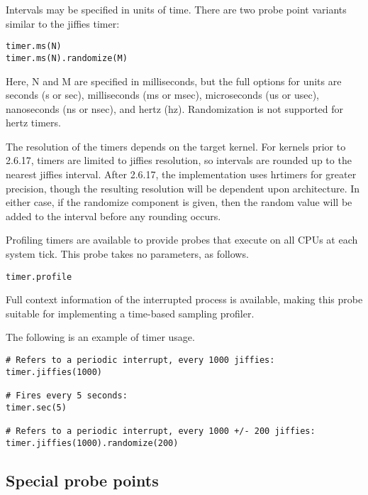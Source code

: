 \documentclass[twoside,english]{article}
\newenvironment{vindent}
{\begin{list}{}{\setlength{\listparindent}{6pt}}
\item[]}
{\end{list}}
\begin{document}
Intervals may be specified in units of time. There are two probe point variants
similar to the jiffies timer:

\begin{vindent}
\begin{verbatim}
timer.ms(N)
timer.ms(N).randomize(M)
\end{verbatim}
\end{vindent}
Here, N and M are specified in milliseconds, but the
full options for units are seconds (s or sec), milliseconds (ms or msec),
microseconds (us or usec), nanoseconds (ns or nsec), and hertz (hz). Randomization
is not supported for hertz timers.

The resolution of the timers depends on the target kernel. For kernels prior
to 2.6.17, timers are limited to jiffies resolution, so intervals are rounded
up to the nearest jiffies interval. After 2.6.17, the implementation uses
hrtimers for greater precision, though the resulting resolution will be dependent
upon architecture. In either case, if the randomize component is given, then
the random value will be added to the interval before any rounding occurs.

Profiling timers are available to provide probes that execute on all CPUs
at each system tick. This probe takes no parameters, as follows.

\begin{vindent}
\begin{verbatim}
timer.profile
\end{verbatim}
\end{vindent}
Full context information of the interrupted process is available, making
this probe suitable for implementing a time-based sampling profiler.

The following is an example of timer usage.

\begin{vindent}
\begin{verbatim}
# Refers to a periodic interrupt, every 1000 jiffies:
timer.jiffies(1000)

# Fires every 5 seconds:
timer.sec(5)

# Refers to a periodic interrupt, every 1000 +/- 200 jiffies:
timer.jiffies(1000).randomize(200)
\end{verbatim}
\end{vindent}

\subsection{Special probe points}
\end{document}
